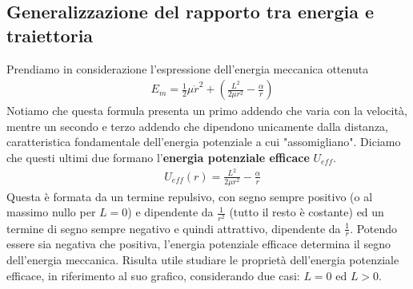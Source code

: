 \subsection{Generalizzazione del rapporto tra energia e traiettoria}
Prendiamo in considerazione l'espressione dell'energia meccanica ottenuta
\begin{align*}
	&E_m= \frac{1}{2}\mu \dot{r}^2+ (\frac{L^2}{2\mu r^2} -\frac{\alpha}{r})
\end{align*}
Notiamo che questa formula presenta un primo addendo che varia con la velocità, mentre un secondo e terzo addendo che dipendono unicamente dalla distanza, caratteristica fondamentale dell'energia potenziale a cui "assomigliano". Diciamo che questi ultimi due formano l'\textbf{energia potenziale efficace} $U_{eff}$.
\begin{align*}
&U_{eff}(r) = \frac{L^2}{2\mu r^2} -\frac{\alpha}{r}
\end{align*}
Questa è formata da un termine repulsivo, con segno sempre positivo (o al massimo nullo per $L=0$) e dipendente da $\frac{1}{r^2}$ (tutto il resto è costante) ed un termine di segno sempre negativo e quindi attrattivo, dipendente da $\frac{1}{r}$. Potendo essere sia negativa che positiva, l'energia potenziale efficace determina il segno dell'energia meccanica.  Risulta utile studiare le proprietà dell'energia potenziale efficace, in riferimento al suo grafico, considerando due casi: $L=0$ ed $L>0$.
\newpage
